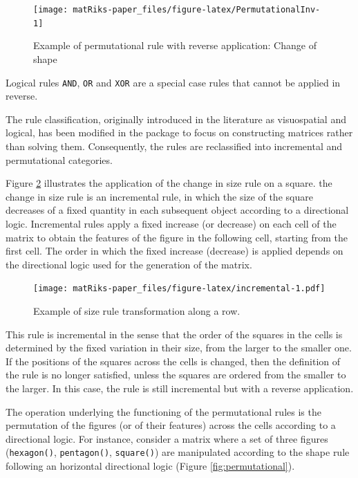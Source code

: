\begin{figure}

{\centering \texttt{[image: matRiks-paper\_files/figure-latex/PermutationalInv-1]} 

}

\caption{Example of  permutational rule with reverse application: Change of shape}\label{fig:PermutationalInv}
\end{figure}

Logical rules \texttt{AND}, \texttt{OR} and \texttt{XOR} are a special case rules that cannot be applied in reverse.

The rule classification, originally introduced in the literature as visuospatial and logical, has been modified in the  package to focus on constructing matrices rather than solving them.
Consequently, the rules are reclassified into incremental and permutational categories.

Figure \ref{fig:incremental} illustrates the application of the change in size rule on a square.
the change in size rule is an incremental rule, in which the size of the square decreases of a fixed quantity in each subsequent object according to a directional logic.
Incremental rules apply a fixed increase (or decrease) on each cell of the matrix to obtain the features of the figure in the following cell, starting from the first cell.
The order in which the fixed increase (decrease) is applied depends on the directional logic used for the generation of the matrix.

\begin{figure}
\centering
\texttt{[image: matRiks-paper\_files/figure-latex/incremental-1.pdf]}
\caption{\label{fig:incremental}Example of size rule transformation along a row.}
\end{figure}

This rule is incremental in the sense that the order of the squares in the cells is determined by the fixed variation in their size, from the larger to the smaller one.
If the positions of the squares across the cells is changed, then the definition of the rule is no longer satisfied, unless the squares are ordered from the smaller to the larger.
In this case, the rule is still incremental but with a reverse application.

The operation underlying the functioning of the permutational rules is the permutation of the figures (or of their features) across the cells according to a directional logic.
For instance, consider a matrix where a set of three figures (\texttt{hexagon()}, \texttt{pentagon()}, \texttt{square()}) are manipulated according to the shape rule following an horizontal directional logic (Figure \ref{fig:permutational}).

